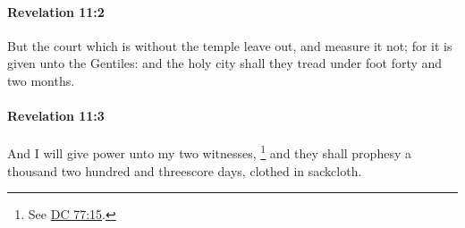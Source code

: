 		\paragraph{Revelation 11:2} %
			\label{REVELATIONNT-11-2}

			But the court which is without the temple leave out, and measure it not; for it is given unto the Gentiles: and the holy city shall they tread under foot forty and two months.

			\begin{framed}
			\scriptsize
				\begin{compactdesc}
					\item[SBLG] 
				\end{compactdesc}
			\end{framed}

		\paragraph{Revelation 11:3} %
			\label{REVELATIONNT-11-3}

			And I will give power unto my two witnesses,%
				\footnote{%
					See \hyperref[DC77-15]{DC 77:15}.
					}
			and they shall prophesy a thousand two hundred and threescore days, clothed in sackcloth.

